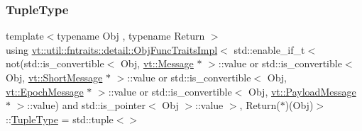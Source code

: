 \subsubsection{\texorpdfstring{Tuple\+Type}{TupleType}}
{\footnotesize\ttfamily template$<$typename Obj , typename Return $>$ \\
using \hyperlink{structvt_1_1util_1_1fntraits_1_1detail_1_1_obj_func_traits_impl}{vt\+::util\+::fntraits\+::detail\+::\+Obj\+Func\+Traits\+Impl}$<$ std\+::enable\+\_\+if\+\_\+t$<$ not(std\+::is\+\_\+convertible$<$ Obj, \hyperlink{namespacevt_a3a3ddfef40b4c90915fa43cdd5f129ea}{vt\+::\+Message} $\ast$ $>$\+::value or std\+::is\+\_\+convertible$<$ Obj, \hyperlink{namespacevt_a1125ac1da6c0bbf141e0ea0739d7602d}{vt\+::\+Short\+Message} $\ast$ $>$\+::value or std\+::is\+\_\+convertible$<$ Obj, \hyperlink{namespacevt_ad67368ffae52d7325002586b41bb150e}{vt\+::\+Epoch\+Message} $\ast$ $>$\+::value or std\+::is\+\_\+convertible$<$ Obj, \hyperlink{namespacevt_a89a92229c5622b855c02c549f83a1a68}{vt\+::\+Payload\+Message} $\ast$ $>$\+::value) and std\+::is\+\_\+pointer$<$ Obj $>$\+::value $>$, Return($\ast$)(Obj)$>$\+::\hyperlink{structvt_1_1util_1_1fntraits_1_1detail_1_1_obj_func_traits_impl_3_01std_1_1enable__if__t_3_01not8a3cf894b8afc41bf28f29f3b0ac693f_a784de26b85c99263380fbff7c4bb6d5d}{Tuple\+Type} =  std\+::tuple$<$$>$}

